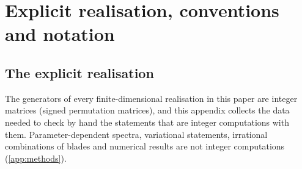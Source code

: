 \chapter{Explicit realisation, conventions and notation}
\label{app:A}



\section{The explicit realisation}
\label{app:realisation}

The generators of every finite-dimensional realisation in this paper are integer matrices (signed permutation matrices), and this appendix collects
the data needed to check by hand the statements that are integer computations with them. Parameter-dependent spectra, variational statements,
irrational combinations of blades and numerical results are not integer computations (\cref{app:methods}).


